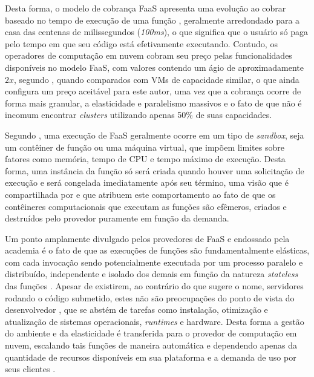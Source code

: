 \documentclass[english,brazilian]{UNISINOSmonografia} %
\begin{document}
Desta forma, o modelo de cobrança FaaS apresenta uma evolução  ao cobrar baseado no tempo de execução de uma função \cite{FowlerServerless, Wang2018}, geralmente arredondado para a casa das centenas de milissegundos (\textit{100ms}), o que significa que o usuário só paga pelo tempo em que seu código está efetivamente executando.
Contudo, os operadores de computação em nuvem cobram seu preço pelas funcionalidades disponíveis no modelo FaaS, com valores contendo um ágio de aproximadamente $2x$, segundo , quando comparados com VMs de capacidade similar, o que ainda configura um preço aceitável para este autor, uma vez que a cobrança ocorre de forma mais granular, a elasticidade e paralelismo massivos e o fato de que não é incomum encontrar \textit{clusters} utilizando apenas 50\% de suas capacidades.



Segundo , uma execução de FaaS geralmente ocorre em um tipo de \textit{sandbox}, seja um contêiner de função ou uma máquina virtual, que impõem limites sobre fatores como memória, tempo de CPU e tempo máximo de execução.
Desta forma, uma instância da função só será criada quando houver uma solicitação de execução e será congelada imediatamente após seu término, uma visão que é compartilhada por  e que atribuem este comportamento ao fato de que os contêineres computacionais que executam as funções são efêmeros, criados e destruídos pelo provedor puramente em função da demanda.



Um ponto amplamente divulgado pelos provedores de FaaS e endossado pela academia é o fato de que as execuções de funções são fundamentalmente elásticas, com cada invocação sendo potencialmente executada por um processo paralelo e distribuído, independente e isolado dos demais em função da natureza \textit{stateless} das funções \cite{SpoialaServerless,Jonas2017,FowlerServerless,Jonas2017}.
Apesar de existirem, ao contrário do que sugere o nome, servidores rodando o código submetido, estes não são preocupações do ponto de vista do desenvolvedor \cite{SpoialaServerless}, que se abstém de tarefas como instalação, otimização e atualização de sistemas operacionais, \textit{runtimes} e hardware.
Desta forma a gestão do ambiente e da elasticidade é transferida para o provedor de computação em nuvem, escalando tais funções de maneira automática e dependendo apenas da quantidade de recursos disponíveis em sua plataforma e a demanda de uso por seus clientes \cite{BoweiHan}.
\end{document}

